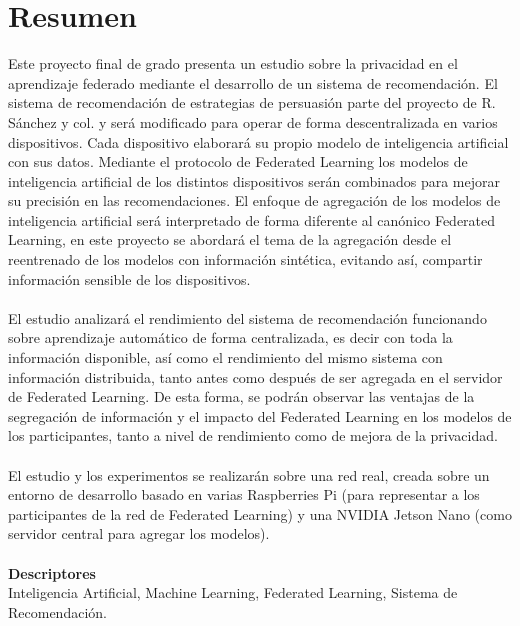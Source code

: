 \chapter*{Resumen}

\thispagestyle{fancy}

Este proyecto final de grado presenta un estudio sobre la privacidad en el aprendizaje federado mediante el desarrollo de un sistema de recomendación. El sistema de recomendación de estrategias de persuasión parte del proyecto de R. Sánchez y col.\autocite{sanchez-corcueraPersuasionbasedRecommenderSystem2020} y será modificado para operar de forma descentralizada en varios dispositivos. Cada dispositivo elaborará su propio modelo de inteligencia artificial con sus datos. Mediante el protocolo de Federated Learning los modelos de inteligencia artificial de los distintos dispositivos serán combinados para mejorar su precisión en las recomendaciones. El enfoque de agregación de los modelos de inteligencia artificial será interpretado de forma diferente al canónico Federated Learning, en este proyecto se abordará el tema de la agregación desde el reentrenado de los modelos con información sintética, evitando así, compartir información sensible de los dispositivos.
\\\\
El estudio analizará el rendimiento del sistema de recomendación funcionando sobre aprendizaje automático de forma centralizada, es decir con toda la información disponible, así como el rendimiento del mismo sistema con información distribuida, tanto antes como después de ser agregada en el servidor de Federated Learning. De esta forma, se podrán observar las ventajas de la segregación de información y el impacto del Federated Learning en los modelos de los participantes, tanto a nivel de rendimiento como de mejora de la privacidad.
\\\\
El estudio y los experimentos se realizarán sobre una red real, creada sobre un entorno de desarrollo basado en varias Raspberries Pi (para representar a los participantes de la red de Federated Learning) y una NVIDIA Jetson Nano (como servidor central para agregar los modelos).
\\\\
\textbf{Descriptores}\\
Inteligencia Artificial, Machine Learning, Federated Learning, Sistema de Recomendación.
